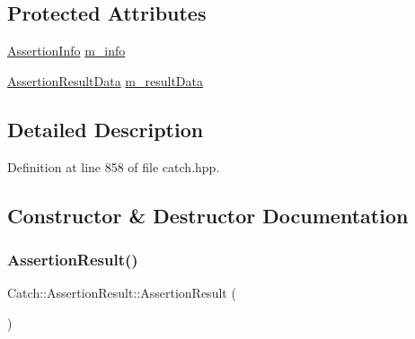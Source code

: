 \subsection*{Protected Attributes}
\begin{DoxyCompactItemize}
\item 
\hyperlink{struct_catch_1_1_assertion_info}{Assertion\+Info} \hyperlink{class_catch_1_1_assertion_result_a3e7236f73a51d6fc8bb9dfdefcee7772}{m\+\_\+info}
\item 
\hyperlink{struct_catch_1_1_assertion_result_data}{Assertion\+Result\+Data} \hyperlink{class_catch_1_1_assertion_result_add3455b8bbedb0d643e18da67c66b4f7}{m\+\_\+result\+Data}
\end{DoxyCompactItemize}


\subsection{Detailed Description}


Definition at line 858 of file catch.\+hpp.



\subsection{Constructor \& Destructor Documentation}
\hypertarget{class_catch_1_1_assertion_result_a570b999c5f66e33cb31d3adb29fec25b}{}\label{class_catch_1_1_assertion_result_a570b999c5f66e33cb31d3adb29fec25b} 
\subsubsection{\texorpdfstring{Assertion\+Result()}{AssertionResult()}\hspace{0.1cm}{\footnotesize\ttfamily [1/2]}}
{\footnotesize\ttfamily Catch\+::\+Assertion\+Result\+::\+Assertion\+Result (\begin{DoxyParamCaption}{ }\end{DoxyParamCaption})}

\hypertarget{class_catch_1_1_assertion_result_ab58aeec27052ba400633ed0e36cea692}{}\label{class_catch_1_1_assertion_result_ab58aeec27052ba400633ed0e36cea692} 
